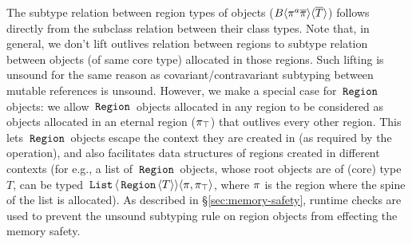 The subtype relation between region types of objects
($B\langle \pi^a\overline{\pi} \rangle\langle \overline{T} \rangle$) follows directly from the
subclass relation between their class types. Note that, in general, we
don't lift outlives relation between regions to subtype relation
between objects (of same core type) allocated in those regions. Such
lifting is unsound for the same reason as covariant/contravariant
subtyping between mutable references is unsound. However, we make a
special case for $\,{\tt Region}\,$ objects: we allow $\,{\tt Region}\,$ objects allocated
in any region to be considered as objects allocated in an eternal
region ($\pi_{\top}$) that outlives every other region. This lets $\,{\tt Region}\,$
objects escape the context they are created in (as required by the
 operation), and also facilitates data structures of
regions created in different contexts (for e.g., a list of $\,{\tt Region}\,$
objects, whose root objects are of (core) type $T$, can be typed
$\,{\tt List}\,\langle \,{\tt Region}\,\langle T \rangle \rangle\langle \pi,\pi_{\top} \rangle$, where $\pi$ is
the region where the spine of the list is allocated). As described in
\S\ref{sec:memory-safety}, runtime checks are used to prevent the
unsound subtyping rule on region objects from effecting the memory safety.



